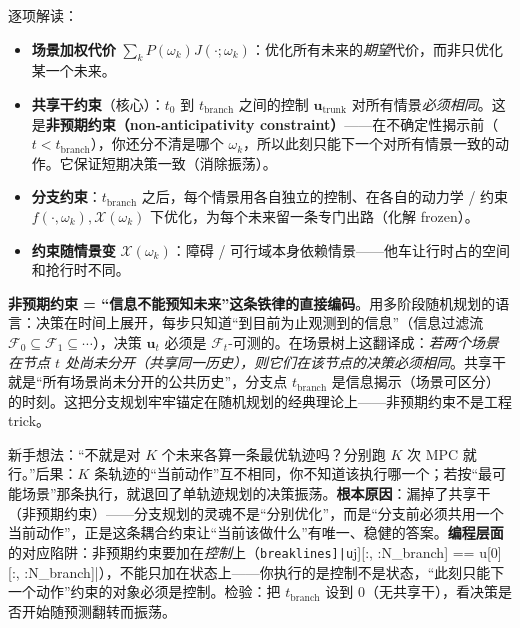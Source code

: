 逐项解读：
\begin{itemize}
  \item \textbf{场景加权代价} $\sum_k P(\omega_k) J(\cdot;\omega_k)$：优化所有未来的\emph{期望}代价，而非只优化某一个未来。
  \item \textbf{共享干约束}（核心）：$t_0$ 到 $t_{\mathrm{branch}}$ 之间的控制 $\mathbf{u}_{\mathrm{trunk}}$ 对所有情景\emph{必须相同}。这是\textbf{非预期约束（non-anticipativity constraint）}——在不确定性揭示前（$t<t_{\mathrm{branch}}$），你还分不清是哪个 $\omega_k$，所以此刻只能下一个对所有情景一致的动作。它保证短期决策一致（消除振荡）。
  \item \textbf{分支约束}：$t_{\mathrm{branch}}$ 之后，每个情景用各自独立的控制、在各自的动力学 / 约束 $f(\cdot,\omega_k),\mathcal{X}(\omega_k)$ 下优化，为每个未来留一条专门出路（化解 frozen）。
  \item \textbf{约束随情景变} $\mathcal{X}(\omega_k)$：障碍 / 可行域本身依赖情景——他车让行时占的空间和抢行时不同。
\end{itemize}

\begin{insight}
\textbf{非预期约束 = “信息不能预知未来”这条铁律的直接编码}。用多阶段随机规划的语言：决策在时间上展开，每步只知道“到目前为止观测到的信息”（信息过滤流 $\mathcal{F}_0\subseteq\mathcal{F}_1\subseteq\cdots$），决策 $\mathbf{u}_t$ 必须是 $\mathcal{F}_t$-可测的。在场景树上这翻译成：\emph{若两个场景在节点 $t$ 处尚未分开（共享同一历史），则它们在该节点的决策必须相同}。共享干就是“所有场景尚未分开的公共历史”，分支点 $t_{\mathrm{branch}}$ 是信息揭示（场景可区分）的时刻。这把分支规划牢牢锚定在随机规划的经典理论上——非预期约束不是工程 trick。
\end{insight}

\begin{pitfall}
新手想法：“不就是对 $K$ 个未来各算一条最优轨迹吗？分别跑 $K$ 次 MPC 就行。”后果：$K$ 条轨迹的“当前动作”互不相同，你不知道该执行哪一个；若按“最可能场景”那条执行，就退回了单轨迹规划的决策振荡。\textbf{根本原因}：漏掉了共享干（非预期约束）——分支规划的灵魂不是“分别优化”，而是“分支前必须共用一个当前动作”，正是这条耦合约束让“当前该做什么”有唯一、稳健的答案。\textbf{编程层面}的对应陷阱：非预期约束要加在\emph{控制}上（\Verb[breaklines]|u[j][:, :N_branch] == u[0][:, :N_branch]|），不能只加在状态上——你执行的是控制不是状态，“此刻只能下一个动作”约束的对象必须是控制。检验：把 $t_{\mathrm{branch}}$ 设到 $0$（无共享干），看决策是否开始随预测翻转而振荡。
\end{pitfall}

